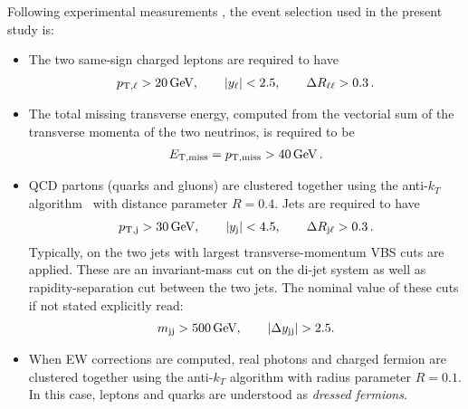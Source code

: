 Following experimental measurements \cite{Aad:2014zda,Aaboud:2016ffv,Khachatryan:2014sta,CMS:2017adb}, the event selection used in the present study is:

\begin{itemize}
    \item The two same-sign charged leptons are required to have
        \begin{align}
        \label{cut:1}
         p_{\text{T},\ell} >  20\,\text{GeV},\qquad |y_{\ell}| < 2.5, \qquad \Delta R_{\ell\ell}> 0.3\,.
        \end{align}
    \item The total missing transverse energy, computed from the vectorial sum of the transverse momenta of the two neutrinos, is required to be
        \begin{align}
        \label{cut:2}
          E_{\text{T},\text{miss}}=p_{\rm T, miss} >  40\,\text{GeV}\,.
        \end{align}
    \item QCD partons (quarks and gluons) are clustered together using the anti-$k_T$ algorithm~\cite{Cacciari:2008gp} with distance parameter $R=0.4$. Jets are required
        to have
        \begin{align}
        \label{cut:3}
         p_{\text{T},\text{j}} >  30\,\text{GeV}, \qquad |y_\text{j}| < 4.5, \qquad \Delta R_{\text{j}\ell} > 0.3 \,.
        \end{align}
        Typically, on the two jets with largest transverse-momentum VBS cuts are applied.
        These are an invariant-mass cut on the di-jet system as well as rapidity-separation cut between the two jets.
        The nominal value of these cuts if not stated explicitly read:
        \begin{align}
        \label{cut:4}
         m_{\text{j} \text{j}} >  500\,\text{GeV},\qquad |\Delta y_{\text{j} \text{j}}| > 2.5.
        \end{align}
    \item When EW corrections are computed, real photons and charged fermion are clustered together using the anti-$k_T$ algorithm with
        radius parameter $R=0.1$. In this case, leptons and quarks are understood as {\it dressed fermions}.
\end{itemize}
